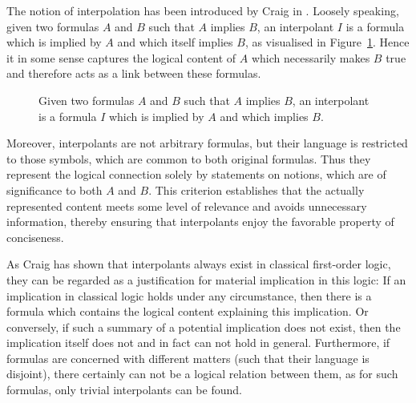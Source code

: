 

The notion of interpolation has been introduced by Craig in \cite{Craig57linear}.
Loosely speaking, given two formulas $A$ and $B$ such that $A$ implies $B$, an interpolant $I$ is a formula which is implied by $A$ and which itself implies $B$, as visualised in Figure~\ref{fig:interpol}.
Hence it in some sense captures the logical content of $A$ which necessarily makes $B$ true and therefore acts as a link between these formulas.

\begin{figure}[htbp]
	\centering
	\label{fig:interpol}
	\caption{Given two formulas $A$ and $B$ such that $A$ implies $B$, an interpolant is a formula $I$ which is implied by $A$ and which implies $B$.}
\end{figure}
Moreover, interpolants are not arbitrary formulas, but their language is restricted to those symbols, which are common to both original formulas.
Thus they represent the logical connection solely by statements on notions, which are of significance to both $A$ and $B$.
This criterion establishes that the actually represented content meets some level of relevance and avoids unnecessary information, thereby ensuring that interpolants enjoy the favorable property of conciseness.

As Craig has shown that interpolants always exist in classical first-order logic, they can be regarded as a justification for material implication in this logic:
If an implication in classical logic holds under any circumstance, then there is a formula which contains the logical content explaining this implication.
Or conversely, if such a summary of a potential implication does not exist, then the implication itself does not and in fact can not hold in general.
Furthermore, if formulas are concerned with different matters (such that their language is disjoint), there certainly can not be a logical relation between them, as for such formulas, only trivial interpolants can be found.

